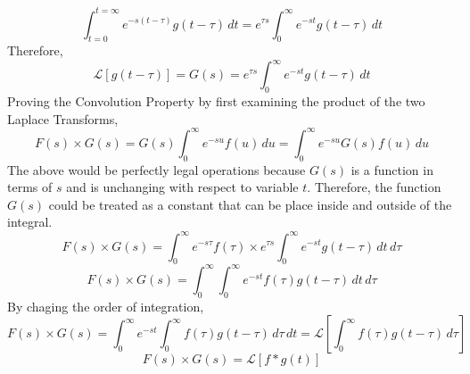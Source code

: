 $$\int^{t = \infty}_{t = 0}e^{-s(t -\tau)}g(t -\tau)\,dt = e^{\tau s}\int^{\infty}_{0}e^{-st}g(t - \tau)\,dt$$
Therefore,
$$\mathcal{L}[g(t-\tau)] = G(s) = e^{\tau s}\int^{\infty}_{0}e^{-st}g(t - \tau)\,dt$$
Proving the Convolution Property by first examining the product of the two Laplace Transforms,
$$F(s)\times G(s) = G(s)\int^{\infty}_{0}e^{-su}f(u)\,du = \int^{\infty}_{0}e^{-su}G(s)f(u)\,du$$
The above would be perfectly legal operations because $G(s)$ is a function in terms of $s$ and is unchanging with respect to variable $t$. Therefore, the function $G(s)$ could be treated as a constant that can be place inside and outside of the integral.
$$F(s)\times G(s) = \int^{\infty}_{0}e^{-s\tau}f(\tau) \times e^{\tau s}\int^{\infty}_{0}e^{-st}g(t - \tau)\,dt\,d\tau$$
$$F(s)\times G(s) = \int^{\infty}_{0}\int^{\infty}_{0}e^{-st}f(\tau)g(t - \tau)\,dt\,d\tau$$
By chaging the order of integration,
$$F(s)\times G(s) = \int^{\infty}_{0}e^{-st}\int^{\infty}_{0}f(\tau)g(t - \tau)\,d\tau\,dt = \mathcal{L}\left[\int^{\infty}_{0}f(\tau)g(t - \tau)\,d\tau\right]$$
$$F(s)\times G(s) = \mathcal{L}\left[f*g(t)\right]$$
